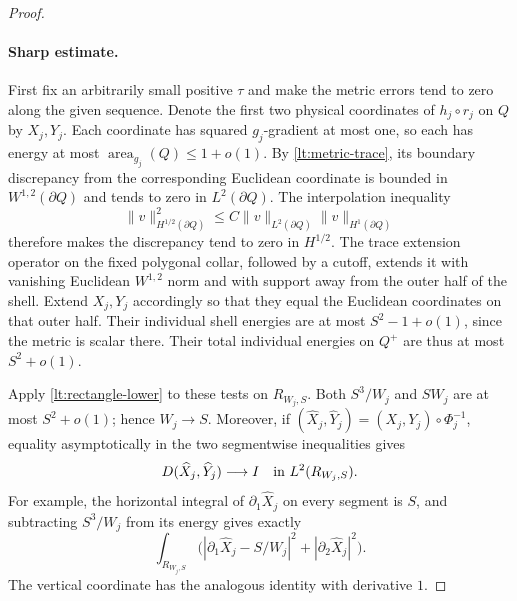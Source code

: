 \begin{proof}
\paragraph{Sharp estimate.}
First fix an arbitrarily small positive
$\tau$ and make the metric errors tend to zero along the given
sequence.  Denote the first two physical coordinates of $h_j\circ r_j$
on $Q$ by $X_j,Y_j$.  Each coordinate has squared $g_j$-gradient at
most one, so each has energy at most
$\operatorname{area}_{g_j}(Q)\leq1+o(1)$.  By
\eqref{lt:metric-trace}, its boundary discrepancy from the corresponding
Euclidean coordinate is bounded in $W^{1,2}(\partial Q)$ and tends to
zero in $L^2(\partial Q)$.  The interpolation inequality
\[
 \|v\|_{H^{1/2}(\partial Q)}^2
      \leq C\|v\|_{L^2(\partial Q)}\|v\|_{H^1(\partial Q)}
\]
therefore makes the discrepancy tend to zero in $H^{1/2}$.
The trace extension operator on the fixed polygonal collar, followed
by a cutoff, extends it with vanishing Euclidean $W^{1,2}$ norm and
with support away from the outer half of the shell.  Extend $X_j,Y_j$
accordingly so that they equal the Euclidean coordinates on that outer
half.  Their individual shell energies are at most
$S^2-1+o(1)$, since the metric is scalar there.  Their total individual
energies on $Q^+$ are thus at most $S^2+o(1)$.

Apply \eqref{lt:rectangle-lower} to these tests on
$R_{W_j,S}$.  Both $S^3/W_j$ and $SW_j$ are at most $S^2+o(1)$;
hence $W_j\to S$.  Moreover, if
$(\widehat X_j,\widehat Y_j)=(X_j,Y_j)\circ\Phi_j^{-1}$, equality
asymptotically in the two segmentwise inequalities gives
\begin{equation}
 D(\widehat X_j,\widehat Y_j)\longrightarrow I
              \quad\hbox{in }L^2(R_{W_j,S}).
 \label{lt:coordinate-rigidity}
\end{equation}
For example, the horizontal integral of
$\partial_1\widehat X_j$ on every segment is $S$, and subtracting
$S^3/W_j$ from its energy gives exactly
\[
 \int_{R_{W_j,S}}
 \bigl(|\partial_1\widehat X_j-S/W_j|^2
               +|\partial_2\widehat X_j|^2\bigr).
\]
The vertical coordinate has the analogous identity with derivative
$1$.


\end{proof}
